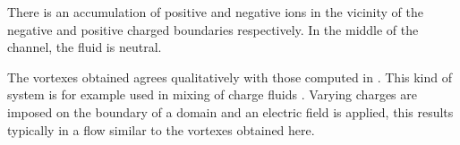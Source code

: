 There is an accumulation of positive and negative ions in the vicinity
of the negative and positive charged boundaries respectively. In the
middle of the channel, the fluid is neutral.

The vortexes obtained agrees qualitatively with those computed in
\cite{lbm-wang}. This kind of system is for example used in mixing of
charge fluids \cite{mixing}. Varying charges are imposed on the
boundary of a domain and an electric field is applied, this results
typically in a flow similar to the vortexes obtained here.

